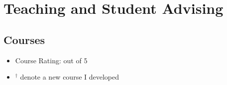 \documentclass[11pt]{article}
\begin{document}



\section{Teaching and Student Advising}

\subsection{Courses}

\begin{itemize}[label={},before=\small]
    \item Course Rating: out of 5
    \item $^{\dagger}$ denote a new course I developed
\end{itemize}
\end{document}
